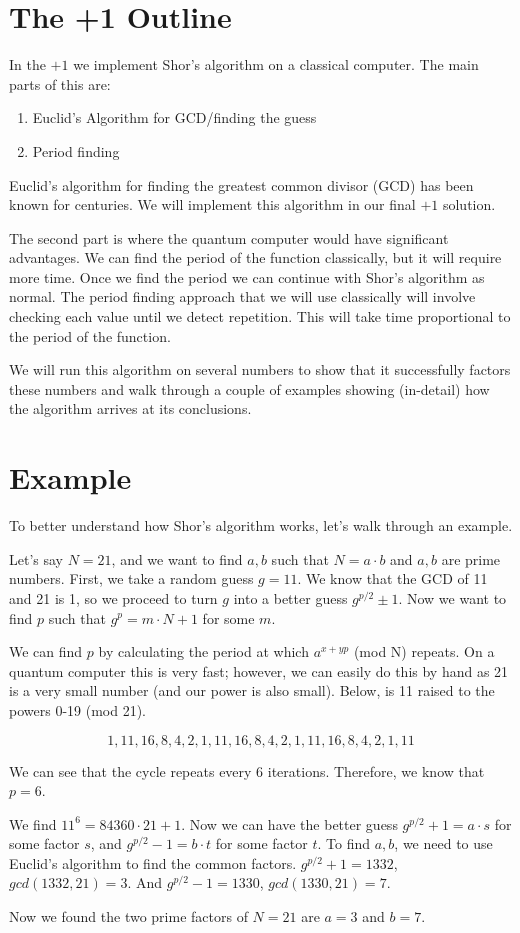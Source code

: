 \documentclass[a4paper]{article}
\begin{document}
\section{The +1 Outline}
In the $+1$ we implement Shor's algorithm on a classical computer. The main parts of this are:
\begin{enumerate}
    \item Euclid's Algorithm for GCD/finding the guess
    \item Period finding
\end{enumerate}

Euclid's algorithm for finding the greatest common divisor (GCD) has been known for centuries. We will implement this algorithm in our final $+1$ solution. 

The second part is where the quantum computer would have significant advantages. We can find the period of the function classically, but it will require more time. Once we find the period we can continue with Shor's algorithm as normal. The period finding approach that we will use classically will involve checking each value until we detect repetition. This will take time proportional to the period of the function. 

We will run this algorithm on several numbers to show that it successfully factors these numbers and walk through a couple of examples showing (in-detail) how the algorithm arrives at its conclusions. 

\section{Example}
To better understand how Shor's algorithm works, let's walk through an example.

Let's say $N=21$, and we want to find $a, b$ such that $N = a \cdot b$ and $a, b$ are prime numbers.
First, we take a random guess $g=11$. We know that the GCD of 11 and 21 is 1, so we proceed to turn $g$ into a better guess $g^{p/2} \pm 1$. Now we want to find $p$ such that $g^p = m \cdot N + 1$ for some $m$.

We can find $p$ by calculating the period at which $a ^{x+ yp}$ (mod N) repeats. On a quantum computer this is very fast; however, we can easily do this by hand as 21 is a very small number (and our power is also small). Below, is 11 raised to the powers 0-19 (mod 21).

$$1, 11, 16, 8, 4, 2, 1, 11, 16, 8, 4, 2, 1, 11, 16, 8, 4, 2, 1, 11$$ 

We can see that the cycle repeats every 6 iterations. Therefore, we know that $p = 6$.

We find $11^ 6 = 84360 \cdot 21 + 1$. Now we can have the better guess $g^{p/2} + 1 = a \cdot s$ for some factor $s$, and $g^{p/2} - 1 = b \cdot t$ for some factor $t$. To find $a,b$, we need to use Euclid's algorithm to find the common factors. 
$g^{p/2} + 1 = 1332$, $gcd(1332, 21) = 3$. And $g^{p/2} - 1 = 1330$, $gcd(1330, 21) = 7$. 

Now we found the two prime factors of $N=21$ are $a = 3$ and $b = 7$.

\newpage


\end{document}
